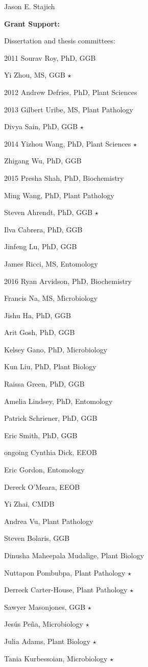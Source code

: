 \documentclass[10pt]{article}
\begin{document}
\begin{cv}{\centerline{Jason E. Stajich}}
\begin{cvlistcompact}{\bf Grant Support:}
\begin{cvlistcompact}{Dissertation and thesis committees:}
\item [2011] Sourav Roy, PhD, GGB
\item Yi Zhou, MS, GGB $\star$
\item [2012] Andrew Defries, PhD, Plant Sciences
\item [2013] Gilbert Uribe, MS, Plant Pathology
\item Divya Sain, PhD, GGB $\star$
\item [2014] Yizhou Wang, PhD, Plant Sciences $\star$
\item Zhigang Wu, PhD, GGB
\item [2015] Presha Shah, PhD, Biochemistry
\item Ming Wang, PhD, Plant Pathology
\item Steven Ahrendt, PhD, GGB $\star$
\item Ilva Cabrera, PhD, GGB
\item Jinfeng Lu, PhD, GGB
\item James Ricci, MS, Entomology
\item [2016] Ryan Arvidson, PhD, Biochemistry
\item Francis Na, MS, Microbiology
\item Jishu Ha, PhD, GGB
\item Arit Gosh, PhD, GGB
\item Kelsey Gano, PhD, Microbiology
\item Kun Liu, PhD, Plant Biology
\item Raissa Green, PhD, GGB
\item Amelia Lindsey, PhD, Entomology
\item Patrick Schriener, PhD, GGB
\item Eric Smith, PhD, GGB
\item [ongoing] Cynthia Dick, EEOB
\item Eric Gordon, Entomology
\item Dereck O'Meara, EEOB
\item Yi Zhai, CMDB
\item Andrea Vu, Plant Pathology
\item Steven Bolaris, GGB
\item Dinusha Maheepala Mudalige, Plant Biology
\item Nuttapon Pombubpa, Plant Pathology $\star$
\item Derreck Carter-House, Plant Pathology $\star$
\item Sawyer Masonjones, GGB $\star$
\item Jes\'{u}s Pe\~{n}a, Microbiology $\star$
\item Julia Adams, Plant Biology $\star$
\item Tania Kurbessoian, Microbiology $\star$


\end{cvlistcompact}
\end{cvlistcompact}
\end{cv}
\end{document}
